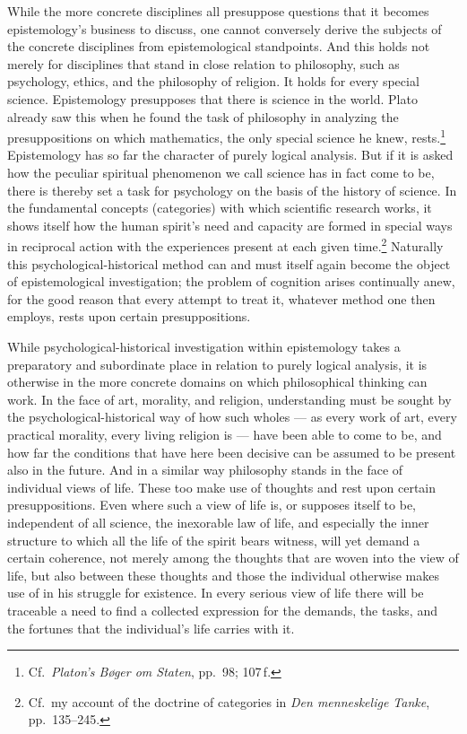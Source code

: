\documentclass[12pt]{book}
\newcommand{\opage}[1]{\marginnote{\footnotesize\textit{[#1]}}}
\begin{document}
While the more concrete disciplines all presuppose questions that it becomes epistemology's
business to discuss, one cannot conversely derive the subjects of the concrete disciplines from
epistemological standpoints. And this holds not merely for disciplines that stand in close
relation to philosophy, such as psychology, ethics, and the philosophy of religion. It holds for
every special science. Epistemology presupposes that there is science in the world. Plato
already saw this when he found the task of philosophy in analyzing the presuppositions on which
mathematics, the only special science he knew, rests.\footnote{Cf.\ \textit{Platon's Bøger om
Staten}, pp.\ 98; 107\,f.} Epistemology has so far the character of purely logical analysis. But
if it is asked how the peculiar spiritual phenomenon we call science has in fact come to be,
there is thereby set a task for psychology on the basis of \opage{7}the history of science. In the
fundamental concepts (categories) with which scientific research works, it shows itself how the
human spirit's need and capacity are formed in special ways in reciprocal action with the
experiences present at each given time.\footnote{Cf.\ my account of the doctrine of categories
in \textit{Den menneskelige Tanke}, pp.\ 135--245.} Naturally this psychological-historical
method can and must itself again become the object of epistemological investigation; the problem
of cognition arises continually anew, for the good reason that every attempt to treat it,
whatever method one then employs, rests upon certain presuppositions.

While psychological-historical investigation within epistemology takes a preparatory and
subordinate place in relation to purely logical analysis, it is otherwise in the more concrete
domains on which philosophical thinking can work. In the face of art, morality, and religion,
understanding must be sought by the psychological-historical way of how such wholes --- as every
work of art, every practical morality, every living religion is --- have been able to come to
be, and how far the conditions that have here been decisive can be assumed to be present also in
the future. And in a similar way philosophy stands in the face of individual views of life.
These too make use of thoughts and rest upon certain presuppositions. Even where such a view of
life is, or supposes itself to be, independent of all science, the inexorable law of life, and
especially the inner structure to which all the life of the spirit bears witness, will yet demand a
certain coherence, not merely among the thoughts that are woven into the view of life, but also
between these thoughts and those the individual otherwise makes use of in his struggle for
existence. In every serious view of life there will be \opage{8}traceable a need to find a collected
expression for the demands, the tasks, and the fortunes that the individual's life carries with
it.
\end{document}
